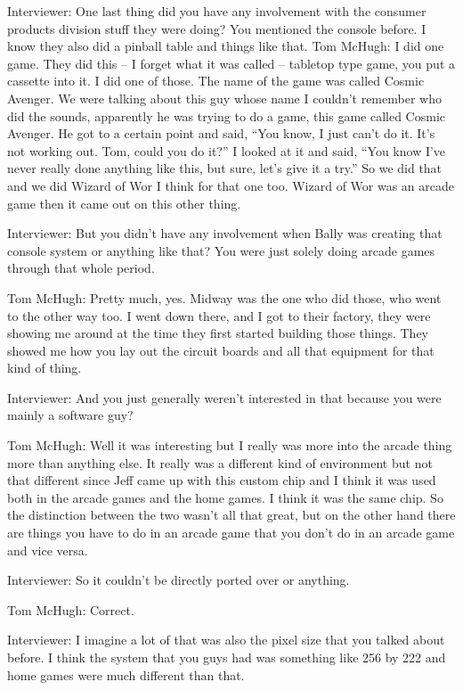 \textcolor{interviewer}{Interviewer:} One last thing did you have any involvement with the consumer products division stuff they were doing? You mentioned the console before. I know they also did a pinball table and things like that.
\textcolor{interviewee}{Tom McHugh:} I did one game. They did this – I forget what it was called – tabletop type game, you put a cassette into it. I did one of those. The name of the game was called Cosmic Avenger. We were talking about this guy whose name I couldn’t remember who did the sounds, apparently he was trying to do a game, this game called Cosmic Avenger. He got to a certain point and said, “You know, I just can’t do it. It’s not working out. Tom, could you do it?” I looked at it and said, “You know I’ve never really done anything like this, but sure, let’s give it a try.” So we did that and we did Wizard of Wor I think for that one too. Wizard of Wor was an arcade game then it came out on this other thing.

\textcolor{interviewer}{Interviewer:} But you didn’t have any involvement when Bally was creating that console system or anything like that? You were just solely doing arcade games through that whole period.

\textcolor{interviewee}{Tom McHugh:} Pretty much, yes. Midway was the one who did those, who went to the other way too. I went down there, and I got to their factory, they were showing me around at the time they first started building those things. They showed me how you lay out the circuit boards and all that equipment for that kind of thing.

\textcolor{interviewer}{Interviewer:} And you just generally weren’t interested in that because you were mainly a software guy?

\textcolor{interviewee}{Tom McHugh:} Well it was interesting but I really was more into the arcade thing more than anything else. It really was a different kind of environment but not that different since Jeff came up with this custom chip and I think it was used both in the arcade games and the home games. I think it was the same chip. So the distinction between the two wasn’t all that great, but on the other hand there are things you have to do in an arcade game that you don’t do in an arcade game and vice versa.

\textcolor{interviewer}{Interviewer:} So it couldn’t be directly ported over or anything.

\textcolor{interviewee}{Tom McHugh:} Correct.

\textcolor{interviewer}{Interviewer:} I imagine a lot of that was also the pixel size that you talked about before. I think the system that you guys had was something like 256 by 222 and home games were much different than that.

